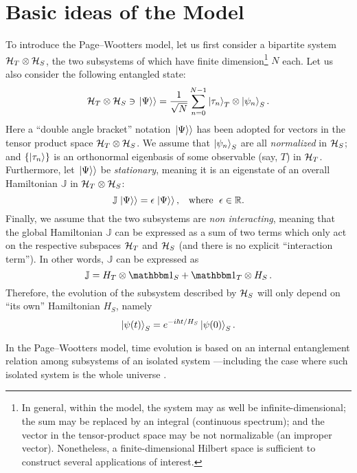 \section{Basic ideas of the Model}

To introduce the Page--Wootters model, let us first consider
a bipartite system $\mathcal{H}_T \otimes \mathcal{H}_S$,
the two subsystems of which have finite dimension\footnote{
  In general, within the model,
  the system may as well be infinite-dimensional;
  the sum may be replaced by an integral (continuous spectrum);
  and the vector in the tensor-product space may be not normalizable (an improper vector).
  Nonetheless, a finite-dimensional Hilbert space is sufficient to construct several applications of interest.
} $N$ each.
Let us also consider the following entangled state:
\begin{equation}\label{eq:pw:finite-entanglement}
  \mathcal{H}_T \otimes \mathcal{H}_S \ni \left.\left| \Psi \right\rangle\right\rangle
  =
  \frac{1}{\sqrt{N}} \sum_{n=0}^{N-1} \ket{\tau_{n}}_{T} \otimes \ket{\psi_{n}}_{S} \text{.}
\end{equation}
Here
a ``double angle bracket'' notation $\left.\left| \Psi \right\rangle\right\rangle$ has been adopted
for vectors in the tensor product space $\mathcal{H}_T \otimes \mathcal{H}_S$.
We assume that $\ket{\psi_{n}}_{S}$ are all \emph{normalized} in $\mathcal{H}_S$;
and
$\qty{\ket{{\tau}_n}}$ is an orthonormal eigenbasis of some observable (say, $T$) in $\mathcal{H}_T$.
Furthermore, let $\left.\left| \Psi \right\rangle\right\rangle$ be \emph{stationary}, meaning it is an eigenstate
of an overall Hamiltonian $\mathbb{J}$ in $\mathcal{H}_T \otimes \mathcal{H}_S$:
$$
  \mathbb{J} \left.\left| \Psi \right\rangle\right\rangle = \epsilon \left.\left| \Psi \right\rangle\right\rangle\text{,} \quad \text{where} \:\:\, \epsilon \in \mathbb{R} \text{.}
$$
Finally, we assume that the two subsystems
are \emph{non interacting},
meaning that the global Hamiltonian $\mathbb{J}$ can be expressed as a sum of two terms
which only act on the respective subspaces $\mathcal{H}_T$ and $\mathcal{H}_S$
(and there is no explicit ``interaction term''). In other words,
$\mathbb{J}$ can be expressed as
$$
  \mathbb{J} = H_T \ox \idop_S + \idop_T \ox H_S \, \text{.} 
$$
Therefore,
the evolution of the subsystem described by $\mathcal{H}_S$
will only depend on ``its own''
Hamiltonian $H_S$, namely
\begin{equation}\label{eq:pw:ordinary_S}
  \ket{\psi(t)}_S = e^{- i \hbar t / H_S } \ket{\psi(0)}_S \text{.}  
\end{equation}
 
In the Page--Wootters model, time evolution is based on an internal entanglement
relation among subsystems of an isolated system
---including the case where such isolated system is the whole universe \parencite{PageWootters}.

